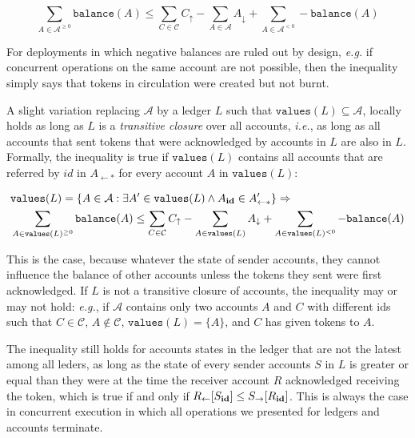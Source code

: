 \documentclass[9pt, oneside]{article}   	%
\begin{document}
\begin{equation}
\label{eq:balance-safety}
\sum\limits_{A \in \mathcal{A}^{\geq 0}} \texttt{balance}(A) \leq  
		\sum\limits_{C \in \mathcal{C}} C_\uparrow 
		- \sum\limits_{A \in \mathcal{A}} A_\downarrow 
		+ \sum\limits_{A \in \mathcal{A}^{< 0}}  -\texttt{balance}(A)
\end{equation}

For deployments in which negative balances are ruled out by design, \textit{e.g.} if concurrent operations on the same account are not possible, then the inequality simply says that tokens in circulation were created but not burnt.


A slight variation replacing $\mathcal{A}$ by a ledger $L$ such that $\texttt{values}(L) \subseteq \mathcal{A}$, locally holds as long as $L$ is a \textit{transitive closure} over all accounts, \textit{i.e.},  as long as all accounts that sent tokens that were acknowledged by accounts in $L$ are also in $L$. Formally, the inequality is true if $\texttt{values}(L)$ contains all accounts that are referred by $id$ in $A_{\leftarrow *}$ for every account $A$ in $\texttt{values}(L)$:

\begin{eqnarray*}
\label{eq:balance-safety-ledger}
 & \texttt{values}(L) = \{ A \in \mathcal{A} : \exists A' \in \texttt{values}(L) \wedge A_{\scriptsize \textbf{id}} \in A'_{\leftarrow *} \} 
\Rightarrow \\
& \sum\limits_{A \in \texttt{values}(L)^{\geq 0}} \texttt{balance}(A) \leq  
		\sum\limits_{C \in \mathcal{C}} C_\uparrow 
		- \sum\limits_{A \in \texttt{values}(L)} A_\downarrow 
		+ \sum\limits_{A \in \texttt{values}(L)^{< 0}}  -\texttt{balance}(A)
\end{eqnarray*}

This is the case, because whatever the state of sender accounts, they cannot influence the balance of other accounts unless the tokens they sent were first acknowledged. If $L$ is not a transitive closure of accounts, the inequality may or may not hold: \textit{e.g.}, if $\mathcal{A}$ contains only two accounts $A$ and $C$ with different ids such that $C \in \mathcal{C}$, $A \notin \mathcal{C}$, $\texttt{values}(L) = \{ A \}$, and $C$ has given tokens to $A$.

The inequality still holds for accounts states in the ledger that are not the latest among all leders, as long as the state of every sender accounts $S$ in $L$ is greater or equal than they were at the time the receiver account $R$ acknowledged receiving the token, which is true if and only if $R_{\leftarrow}[S_{\scriptsize \textbf{id}}] \leq S_{\rightarrow}[R_{\scriptsize \textbf{id}}]$. This is always the case in concurrent execution in which all operations we presented for ledgers and accounts terminate.
\end{document}
